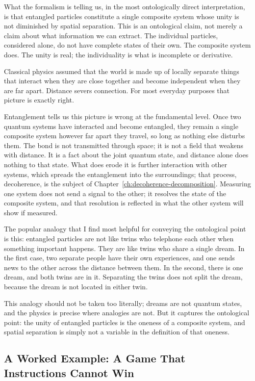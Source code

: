 What the formalism is telling us, in the most ontologically direct interpretation, is that entangled particles constitute a single composite system whose unity is not diminished by spatial separation. This is an ontological claim, not merely a claim about what information we can extract. The individual particles, considered alone, do not have complete states of their own. The composite system does. The unity is real; the individuality is what is incomplete or derivative.

Classical physics assumed that the world is made up of locally separate things that interact when they are close together and become independent when they are far apart. Distance severs connection. For most everyday purposes that picture is exactly right.

Entanglement tells us this picture is wrong at the fundamental level. Once two quantum systems have interacted and become entangled, they remain a single composite system however far apart they travel, so long as nothing else disturbs them. The bond is not transmitted through space; it is not a field that weakens with distance. It is a fact about the joint quantum state, and distance alone does nothing to that state. What does erode it is further interaction with other systems, which spreads the entanglement into the surroundings; that process, decoherence, is the subject of Chapter~\ref{ch:decoherence-decomposition}. Measuring one system does not send a signal to the other; it resolves the state of the composite system, and that resolution is reflected in what the other system will show if measured.

The popular analogy that I find most helpful for conveying the ontological point is this: entangled particles are not like twins who telephone each other when something important happens. They are like twins who share a single dream. In the first case, two separate people have their own experiences, and one sends news to the other across the distance between them. In the second, there is one dream, and both twins are in it. Separating the twins does not split the dream, because the dream is not located in either twin.

This analogy should not be taken too literally; dreams are not quantum states, and the physics is precise where analogies are not. But it captures the ontological point: the unity of entangled particles is the oneness of a composite system, and spatial separation is simply not a variable in the definition of that oneness.

\subsection*{A Worked Example: A Game That Instructions Cannot Win}

